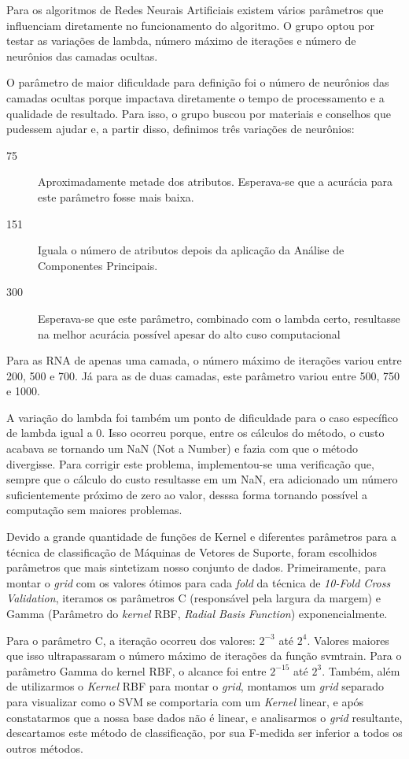 \documentclass[10pt, conference, compsocconf]{IEEEtran}
\begin{document}
Para os algoritmos de Redes Neurais Artificiais existem vários parâmetros que
influenciam diretamente no funcionamento do algoritmo. O grupo optou por testar
as variações de lambda, número máximo de iterações e número de neurônios das
camadas ocultas. 

O parâmetro de maior dificuldade para definição foi o número de
neurônios das camadas ocultas porque impactava diretamente o tempo de
processamento e a qualidade de resultado. Para isso, o grupo buscou por
materiais e conselhos que pudessem ajudar e, a partir disso, definimos três
variações de neurônios: 
    \begin{description}
        \item[75]{Aproximadamente metade dos atributos. Esperava-se que a
        acurácia para este parâmetro fosse mais baixa.}
        \item[151]{Iguala o número de atributos depois da aplicação da Análise
        de Componentes Principais.}
        \item[300]{Esperava-se que este parâmetro, combinado com o lambda certo,
        resultasse na melhor acurácia possível apesar do alto cuso
        computacional}
    \end{description}

Para as RNA de apenas uma camada, o número máximo de iterações variou entre 200,
500 e 700. Já para as de duas camadas, este parâmetro variou entre 500, 750 e
1000.

A variação do lambda foi também um ponto de dificuldade para o caso específico
de lambda igual a 0. Isso ocorreu porque, entre os cálculos do método, o custo
acabava se tornando um NaN (Not a Number) e fazia com que o método divergisse.
Para corrigir este problema, implementou-se uma verificação que, sempre que o
cálculo do custo resultasse em um NaN, era adicionado um número suficientemente
próximo de zero ao valor, desssa forma tornando possível a computação sem
maiores problemas.

Devido a grande quantidade de funções de Kernel e diferentes parâmetros para a
técnica de classificação de Máquinas de Vetores de Suporte, foram escolhidos
parâmetros que mais sintetizam nosso conjunto de dados. Primeiramente, para
montar o \textit{grid} com os valores ótimos para cada \textit{fold} da técnica 
de \textit{10-Fold Cross Validation}, iteramos os parâmetros C (responsável 
pela largura da margem) e Gamma (Parâmetro do \textit{kernel} RBF,
\textit{Radial Basis Function}) exponencialmente.

Para o parâmetro C, a iteração ocorreu dos valores: $2^{-3}$ até $2^4$. Valores 
maiores que isso ultrapassaram o número máximo de iterações da função svmtrain. 
Para o parâmetro Gamma do kernel RBF, o alcance foi entre $2^{-15}$ até $2^3$.
Também, além de utilizarmos o \textit{Kernel} RBF para montar o \textit{grid}, 
montamos um \textit{grid} separado para visualizar como o SVM se comportaria 
com um \textit{Kernel} linear, e após constatarmos que a nossa base dados não 
é linear, e analisarmos o \textit{grid} resultante, descartamos este método 
de classificação, por sua F-medida ser inferior a todos os outros métodos.
\end{document}
